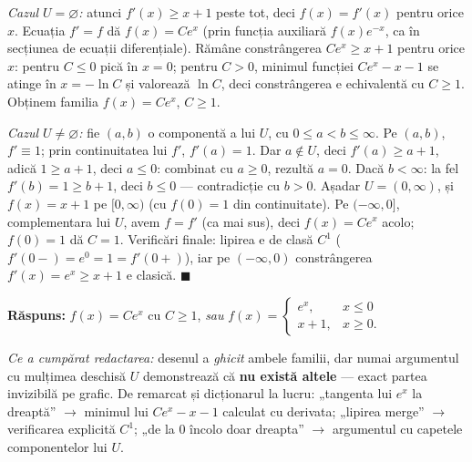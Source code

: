 \emph{Cazul $U=\varnothing$:} atunci $f'(x)\ge x+1$ peste tot, deci $f(x)=f'(x)$ pentru orice $x$. Ecuația $f'=f$ dă $f(x)=Ce^x$ (prin funcția auxiliară $f(x)e^{-x}$, ca în secțiunea de ecuații diferențiale). Rămâne constrângerea $Ce^x\ge x+1$ pentru orice $x$: pentru $C\le0$ pică în $x=0$; pentru $C>0$, minimul funcției $Ce^x-x-1$ se atinge în $x=-\ln C$ și valorează $\ln C$, deci constrângerea e echivalentă cu $C\ge1$. Obținem familia $f(x)=Ce^x$, $C\ge1$.

\emph{Cazul $U\neq\varnothing$:} fie $(a,b)$ o componentă a lui $U$, cu $0\le a<b\le\infty$. Pe $(a,b)$, $f'\equiv1$; prin continuitatea lui $f'$, $f'(a)=1$. Dar $a\notin U$, deci $f'(a)\ge a+1$, adică $1\ge a+1$, deci $a\le0$: combinat cu $a\ge0$, rezultă $a=0$. Dacă $b<\infty$: la fel $f'(b)=1\ge b+1$, deci $b\le0$ --- contradicție cu $b>0$. Așadar $U=(0,\infty)$, și $f(x)=x+1$ pe $[0,\infty)$ (cu $f(0)=1$ din continuitate). Pe $(-\infty,0]$, complementara lui $U$, avem $f=f'$ (ca mai sus), deci $f(x)=Ce^x$ acolo; $f(0)=1$ dă $C=1$. Verificări finale: lipirea e de clasă $C^1$ ($f'(0-)=e^0=1=f'(0+)$), iar pe $(-\infty,0)$ constrângerea $f'(x)=e^x\ge x+1$ e clasică. \hfill$\blacksquare$

\textbf{Răspuns:} $f(x)=Ce^x$ cu $C\ge1$, \emph{sau} $f(x)=\begin{cases}e^x,&x\le0\\ x+1,&x\ge0.\end{cases}$

\emph{Ce a cumpărat redactarea:} desenul a \emph{ghicit} ambele familii, dar numai argumentul cu mulțimea deschisă $U$ demonstrează că \textbf{nu există altele} --- exact partea invizibilă pe grafic. De remarcat și dicționarul la lucru: „tangenta lui $e^x$ la dreaptă'' $\to$ minimul lui $Ce^x-x-1$ calculat cu derivata; „lipirea merge'' $\to$ verificarea explicită $C^1$; „de la $0$ încolo doar dreapta'' $\to$ argumentul cu capetele componentelor lui $U$.

